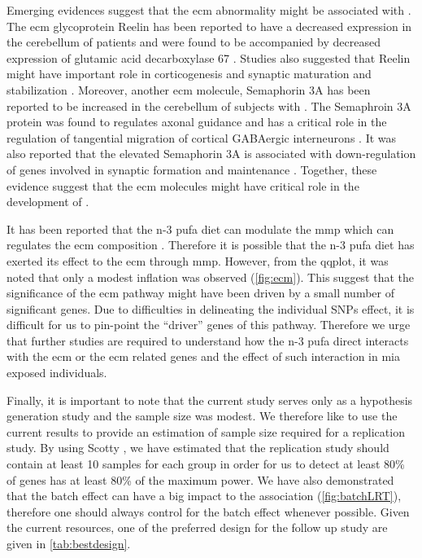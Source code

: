 \documentclass[12pt]{scrbook}
\newcommand*{\glng}{\glsentrylong}
\begin{document}
Emerging evidences suggest that the \gls{ecm} abnormality might be associated with \glng{scz} \citep{Berretta2012}.
The \gls{ecm} glycoprotein Reelin has been reported to have a decreased expression in the cerebellum of \glng{scz} patients \citep{Maloku2010} and were found to be accompanied by decreased expression of glutamic acid decarboxylase 67 \citep{Costa2001}.
Studies also suggested that Reelin might have important role in corticogenesis and synaptic maturation and stabilization \citep{Berretta2012}.
Moreover, another \gls{ecm} molecule, Semaphorin 3A has been reported to be increased in the cerebellum of subjects with \glng{scz} \citep{Eastwood2003}.
The Semaphroin 3A protein was found to regulates axonal guidance and has a critical role in the  regulation of tangential migration of cortical GABAergic interneurons \citep{Zimmer2010}.
It was also reported that the elevated Semaphorin 3A is associated with down-regulation of genes involved in synaptic formation and maintenance \citep{Eastwood2003}.
Together, these evidence suggest that the \gls{ecm} molecules might have critical role in the development of \glng{scz}.

It has been reported that the n-3 \gls{pufa} diet can modulate the \gls{mmp} \citep{Derosa2009,Kavazos2015} which can regulates the \gls{ecm} composition \citep{Stamenkovic2003}.
Therefore it is possible that the n-3 \gls{pufa} diet has exerted its effect to the \gls{ecm} through \gls{mmp}.
However, from the \gls{qqplot}, it was noted that only a modest inflation was observed (\cref{fig:ecm}).
This suggest that the significance of the \gls{ecm} pathway might have been driven by a small number of significant genes.
Due to difficulties in delineating the individual \glspl{SNP} effect, it is difficult for us to pin-point the ``driver'' genes of this pathway.
Therefore we urge that further studies are required to understand how the n-3 \gls{pufa} direct interacts with the \gls{ecm} or the \gls{ecm} related genes and the effect of such interaction in \gls{mia} exposed individuals.

Finally, it is important to note that the current study serves only as a hypothesis generation study and the sample size was modest. 
We therefore like to use the current results to provide an estimation of sample size required for a replication study.
By using Scotty \citep{Busby2013}, we have estimated that the replication study should contain at least 10 samples for each group in order for us to detect at least 80\% of genes has at least 80\% of the maximum power. 
We have also demonstrated that the batch effect can have a big impact to the association (\cref{fig:batchLRT}), therefore one should always control for the batch effect whenever possible.
Given the current resources, one of the preferred design for the follow up study are given in \cref{tab:bestdesign}.
\end{document}
